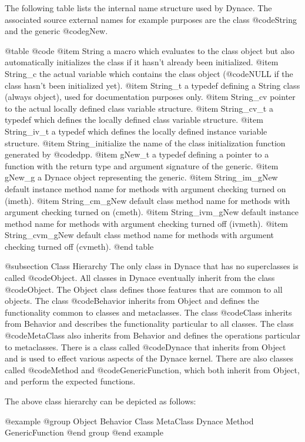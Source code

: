 The following table lists the internal name structure used by Dynace.
The associated source external names for example purposes are the class
@code{String} and the generic @code{gNew}.

@table @code
@item String
a macro which evaluates to the class object but also automatically
initializes the class if it hasn't already been initialized.
@item String_c
the actual variable which contains the class object (@code{NULL} if the
class hasn't been initialized yet).
@item String_t
a typedef defining a String class (always object), used for documentation
purposes only.
@item String_cv
pointer to the actual locally defined class variable structure.
@item String_cv_t
a typedef which defines the locally defined class variable structure.
@item String_iv_t
a typedef which defines the locally defined instance variable structure.
@item String_initialize
the name of the class initialization function generated by @code{dpp}.
@item gNew_t
a typedef defining a pointer to a function with the return type and argument
signature of the generic.
@item gNew_g
a Dynace object representing the generic.
@item String_im_gNew
default instance method name for methods with argument checking turned on
(imeth).
@item String_cm_gNew
default class method name for methods with argument checking turned on
(cmeth).
@item String_ivm_gNew
default instance method name for methods with argument checking turned off
(ivmeth).
@item String_cvm_gNew
default class method name for methods with argument checking turned off
(cvmeth).
@end table


@subsection Class Hierarchy
The only class in Dynace that has no superclasses is called
@code{Object}.  All classes in Dynace eventually inherit from the class
@code{Object}.  The Object class defines those features that are common
to all objects.  The class @code{Behavior} inherits from Object and
defines the functionality common to classes and metaclasses.  The class
@code{Class} inherits from Behavior and describes the functionality
particular to all classes.  The class @code{MetaClass} also inherits
from Behavior and defines the operations particular to metaclasses.
There is a class called @code{Dynace} that inherits from Object and is
used to effect various aspects of the Dynace kernel.  There are also
classes called @code{Method} and @code{GenericFunction}, which both inherit
from Object, and perform the expected functions.

The above class hierarchy can be depicted as follows:

@example
@group
     Object
          Behavior
               Class
               MetaClass
          Dynace
          Method
          GenericFunction
@end group
@end example

